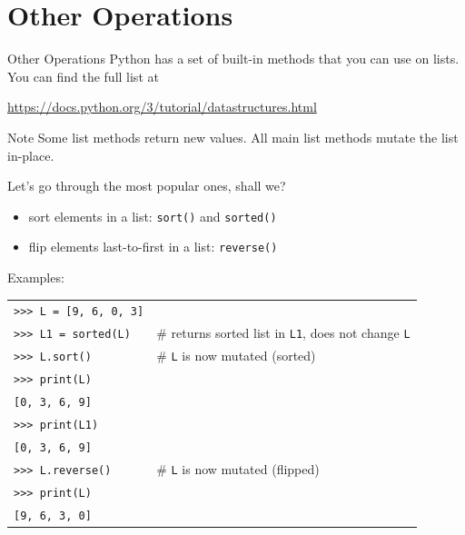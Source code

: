\documentclass[t,handout,9pt]{beamer}
\begin{document}
\section{Other Operations}
\begin{frame}{Other Operations}
\vfill
Python has a set of built-in methods that you can use on lists.
\vfill
You can find the full list at
\begin{center}
\url{https://docs.python.org/3/tutorial/datastructures.html}
\end{center}
\vfill
\begin{block}{Note}
Some list methods return new values. All main list methods mutate the list in-place.
\end{block}
\vfill
Let's go through the most popular ones, shall we?
\vfill
\end{frame}
%
\begin{frame}
\vfill
\begin{itemize}
	\item sort elements in a list: \texttt{sort()} and \texttt{sorted()}
	\item flip elements last-to-first in a list: \texttt{reverse()}
\end{itemize}
\vfill
Examples:
\begin{table}[]
\begin{flushleft}
\begin{tabular}{ll}
\texttt{>{}>{}> L = [9, 6, 0, 3]} &  \\
\texttt{>{}>{}> L1 = sorted(L)} &  \# returns sorted list in \texttt{L1}, does not change \texttt{L}\\
\texttt{>{}>{}> L.sort()} &  \# \texttt{L} is now mutated (sorted)\\
\texttt{>{}>{}> print(L)} &  \\
\texttt{[0, 3, 6, 9]} &  \\
\texttt{>{}>{}> print(L1)} &  \\
\texttt{[0, 3, 6, 9]} &  \\
\texttt{>{}>{}> L.reverse()} &  \# \texttt{L} is now mutated (flipped)\\
\texttt{>{}>{}> print(L)} &  \\
\texttt{[9, 6, 3, 0]} &  \\
\end{tabular}
\end{flushleft}
\end{table}
\vfill
\end{frame}
%
\end{document}
